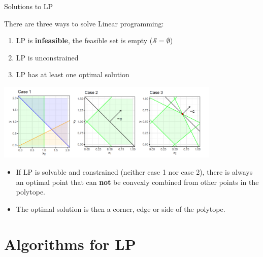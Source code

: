 \begin{vbframe}{Solutions to LP}

There are three ways to solve Linear programming:

\begin{enumerate}
\item LP is \textbf{infeasible}, the feasible set is empty ($\mathcal{S} = \emptyset$)
\item LP is unconstrained
\item LP has at least one optimal solution
\end{enumerate}


\begin{center}
\includegraphics[width = 0.8\textwidth]{figure_man/solutions-lp.png}
\end{center}


\framebreak

\begin{itemize}
\item If LP is solvable and constrained (neither case 1 nor case 2), there is always an optimal point that can  \textbf{not} be convexly combined from other points in the polytope.
\item The optimal solution is then a corner, edge or side of the polytope.
\end{itemize}


\end{vbframe}

\section{Algorithms for LP}

